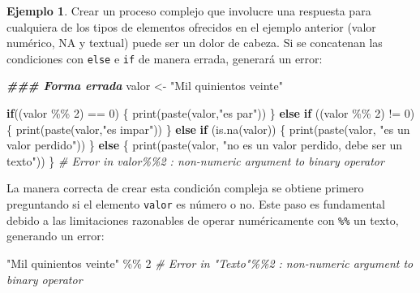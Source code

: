 \documentclass[
]{article}
\newenvironment{Shaded}{\begin{snugshade}}{\end{snugshade}}
\newcommand{\CommentTok}[1]{\textcolor[rgb]{0.56,0.35,0.01}{\textit{#1}}}
\newcommand{\ControlFlowTok}[1]{\textcolor[rgb]{0.13,0.29,0.53}{\textbf{#1}}}
\newcommand{\DecValTok}[1]{\textcolor[rgb]{0.00,0.00,0.81}{#1}}
\newcommand{\DocumentationTok}[1]{\textcolor[rgb]{0.56,0.35,0.01}{\textbf{\textit{#1}}}}
\newcommand{\FunctionTok}[1]{\textcolor[rgb]{0.00,0.00,0.00}{#1}}
\newcommand{\NormalTok}[1]{#1}
\newcommand{\OtherTok}[1]{\textcolor[rgb]{0.56,0.35,0.01}{#1}}
\newcommand{\SpecialCharTok}[1]{\textcolor[rgb]{0.00,0.00,0.00}{#1}}
\newcommand{\StringTok}[1]{\textcolor[rgb]{0.31,0.60,0.02}{#1}}
\theoremstyle{definition}
\theoremstyle{definition}
\newtheorem{example}{Ejemplo}[section]
\theoremstyle{definition}
\theoremstyle{definition}
\theoremstyle{remark}
\begin{document}
\begin{example}

Crear un proceso complejo que involucre una respuesta para cualquiera de los tipos de elementos ofrecidos en el ejemplo anterior (valor numérico, NA y textual) puede ser un dolor de cabeza. Si se concatenan las condiciones con \texttt{else} e \texttt{if} de manera errada, generará un error:

\begin{Shaded}
\begin{Highlighting}[]
\DocumentationTok{\#\#\# Forma errada}
\NormalTok{valor }\OtherTok{\textless{}{-}} \StringTok{"Mil quinientos veinte"}

\ControlFlowTok{if}\NormalTok{((valor }\SpecialCharTok{\%\%} \DecValTok{2}\NormalTok{) }\SpecialCharTok{==} \DecValTok{0}\NormalTok{) \{}
  \FunctionTok{print}\NormalTok{(}\FunctionTok{paste}\NormalTok{(valor,}\StringTok{"es par"}\NormalTok{))}
\NormalTok{  \} }\ControlFlowTok{else} \ControlFlowTok{if}\NormalTok{ ((valor }\SpecialCharTok{\%\%} \DecValTok{2}\NormalTok{) }\SpecialCharTok{!=} \DecValTok{0}\NormalTok{) \{}
    \FunctionTok{print}\NormalTok{(}\FunctionTok{paste}\NormalTok{(valor,}\StringTok{"es impar"}\NormalTok{)) }
\NormalTok{    \} }\ControlFlowTok{else} \ControlFlowTok{if}\NormalTok{ (}\FunctionTok{is.na}\NormalTok{(valor)) \{}
      \FunctionTok{print}\NormalTok{(}\FunctionTok{paste}\NormalTok{(valor, }\StringTok{"es un valor perdido"}\NormalTok{))}
\NormalTok{    \} }\ControlFlowTok{else}\NormalTok{ \{}
      \FunctionTok{print}\NormalTok{(}\FunctionTok{paste}\NormalTok{(valor, }\StringTok{"no es un valor perdido, debe ser un texto"}\NormalTok{))}
\NormalTok{    \}}
\CommentTok{\# Error in valor\%\%2 : non{-}numeric argument to binary operator}
\end{Highlighting}
\end{Shaded}

La manera correcta de crear esta condición compleja se obtiene primero preguntando si el elemento \texttt{valor} es número o no. Este paso es fundamental debido a las limitaciones razonables de operar numéricamente con \texttt{\%\%} un texto, generando un error:

\begin{Shaded}
\begin{Highlighting}[]
\StringTok{"Mil quinientos veinte"} \SpecialCharTok{\%\%} \DecValTok{2}
\CommentTok{\# Error in "Texto"\%\%2 : non{-}numeric argument to binary operator}
\end{Highlighting}
\end{Shaded}


\end{example}
\end{document}
